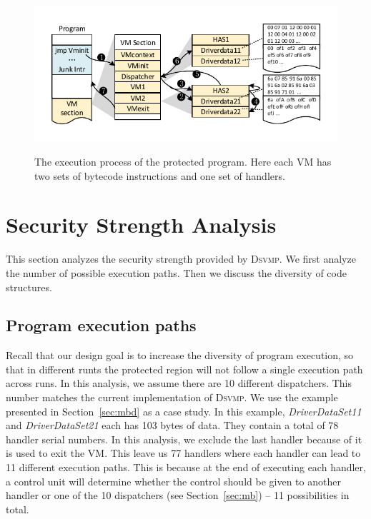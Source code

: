 \documentclass[conference]{IEEEtran}
\newcommand{\DSVMP}{\textsc{Dsvmp}\xspace}
\begin{document}
\begin{figure}[t]
  \centering
  \includegraphics[width=1.0\columnwidth]{figure/figex.pdf}\\
  \caption{The execution process of the protected program. Here each VM has two sets of bytecode instructions and one set of handlers.}\label{fig:Fig.5}
  \vspace{-5mm}
\end{figure}

\section{Security Strength Analysis}
This section analyzes the security strength provided by \DSVMP. We first analyze the number of possible execution paths. Then we discuss the diversity of code structures.

\subsection{Program execution paths}
Recall that our design goal is to increase the diversity of program execution,
so that in different runts the protected region will not follow a single execution path across runs.
In this analysis, we assume there are 10 different dispatchers. This number matches the current implementation of \DSVMP.
We use the example presented in Section~\ref{sec:mbd} as a case study.
In this example,  \emph{DriverDataSet11} and
\emph{DriverDataSet21} each has 103 bytes of data. They contain a total of 78 handler
serial numbers. In this analysis, we exclude the last handler because of it is used to exit the VM.
This leave us 77 handlers where each handler can lead to 11 different execution paths.
This is because at the end of executing each handler, a control unit will determine whether the control 
should be given to another handler or one of the 10 dispatchers (see Section~\ref{sec:mb}) -- 11 possibilities in total.
\end{document}
